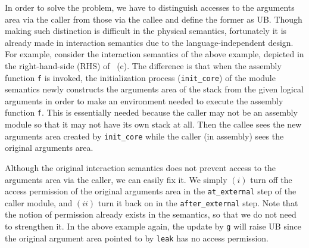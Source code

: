 %
In order to solve the problem, we have to distinguish accesses to the
arguments area via the caller from those via the callee and define the
former as UB. Though making such distinction is difficult in the
physical semantics, fortunately it is already made in interaction
semantics due to the language-independent design. For example, consider
the interaction semantics of the above example, depicted in the
right-hand-side (RHS) of ~(c).  The
difference is that when the assembly function \texttt{f} is invoked,
the initialization process (\ie \texttt{init\_core}) of the module
semantics newly constructs the arguments area of the stack from the
given logical arguments in order to make an environment needed to
execute the assembly function \texttt{f}. This is essentially needed
because the caller may not be an assembly module so that it may not
have its own stack at all.  Then the callee sees the new arguments
area created by \texttt{init\_core} while the caller (in assembly)
sees the original arguments area.

Although the original interaction semantics does not prevent access to
the arguments area via the caller, we can easily fix it.
We simply $(i)$ turn off the access
permission of the original arguments area in the \texttt{at\_external}
step of the caller module, and $(ii)$ turn it back on in the
\texttt{after\_external} step. Note that the notion of permission
already exists in the \cc{} semantics, so that we do not
need to strengthen it. In the above example again,
the update by \texttt{g} will raise UB since the original argument area pointed
to by \texttt{leak} has no access permission.
